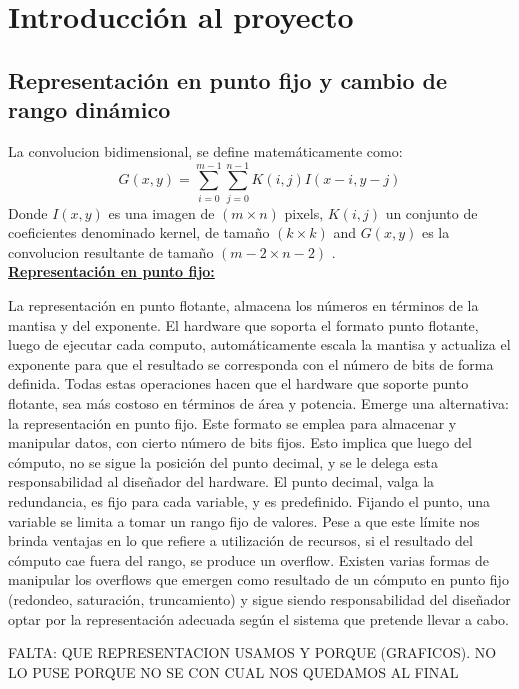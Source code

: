 \documentclass[a4paper]{article}
\begin{document}
\section{Introducción al proyecto} \label{intro_secc}
\subsection{Representación en punto fijo y cambio de rango dinámico }\label{fixedpoint}
La convolucion bidimensional, se define matemáticamente como:
\begin{equation}\label{conv-org}
  G(x,y) = \sum_{i=0}^{m-1} \sum_{j=0}^{n-1}K(i,j)I(x-i,y-j)
\end{equation}
Donde $I(x,y)$ es una imagen de $(m \times n)$ pixels, $K(i,j)$ un conjunto de coeficientes denominado kernel, de tamaño
$(k \times k)$ and $G(x,y)$ es la convolucion resultante de tamaño  $(m-2 \times n-2)$ .\\

\underline{\textbf{Representación en punto fijo:}}

La representación en punto flotante, almacena los números en términos de la mantisa y del exponente. El hardware que soporta el formato punto flotante, luego de ejecutar cada computo, 
automáticamente escala la mantisa y actualiza el exponente para que el resultado se corresponda con el número de bits de forma definida. Todas estas operaciones hacen que el hardware que soporte punto flotante,
sea más costoso en términos de área y potencia. Emerge una alternativa: la representación en punto fijo.
Este formato se emplea para almacenar y manipular datos, con cierto número de bits fijos. Esto implica que luego del cómputo, no se sigue la posición del punto decimal, y
se le delega esta responsabilidad al diseñador del hardware. El punto decimal, valga la redundancia, es fijo para cada variable, y es predefinido.
Fijando el punto, una variable se limita a tomar un rango fijo de valores.
Pese a que este límite nos brinda ventajas en lo que refiere a utilización de recursos, si el resultado del cómputo cae fuera del rango, se produce un overflow. Existen varias
formas de manipular los overflows que emergen como resultado de un cómputo en punto fijo (redondeo, saturación, truncamiento) y sigue siendo responsabilidad del diseñador optar por
la representación adecuada según el sistema que pretende llevar a cabo.

FALTA:    QUE REPRESENTACION USAMOS Y  PORQUE (GRAFICOS). NO LO PUSE PORQUE NO SE CON CUAL NOS QUEDAMOS AL FINAL
\end{document}
